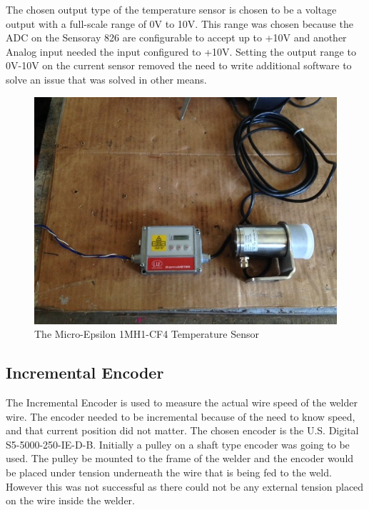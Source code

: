 \documentclass[12pt]{article}
\begin{document}
The chosen output type of the temperature sensor is chosen to be a voltage output with a full-scale range of 0V to 10V. This range was chosen because the ADC on the Sensoray 826 are configurable to accept up to +10V and another Analog input needed the input configured to +10V. Setting the output range to 0V-10V on the current sensor removed the need to write additional software to solve an issue that was solved in other means.

\clearpage

\begin{figure}[!h]
\centering
\includegraphics[scale=0.5]{tempsensor}
\caption{The Micro-Epsilon 1MH1-CF4 Temperature Sensor}
\end{figure}

\subsection{Incremental Encoder}

The Incremental Encoder is used to measure the actual wire speed of the welder wire. The encoder needed to be incremental because of the need to know speed, and that current position did not matter. The chosen encoder is the U.S. Digital S5-5000-250-IE-D-B. Initially a pulley on a shaft type encoder was going to be used. The pulley be mounted to the frame of the welder and the encoder would be placed under tension underneath the wire that is being fed to the weld. However this was not successful as there could not be any external tension placed on the wire inside the welder.\\
\end{document}
